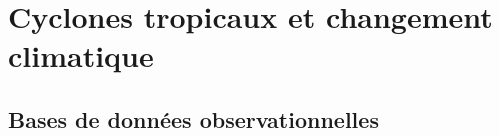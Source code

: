 \documentclass[../main.tex]{subfiles}
\begin{document}
% 
% 
% 
% 

\section{Cyclones tropicaux et changement climatique}

\subsection{Bases de données observationnelles}
\end{document}
